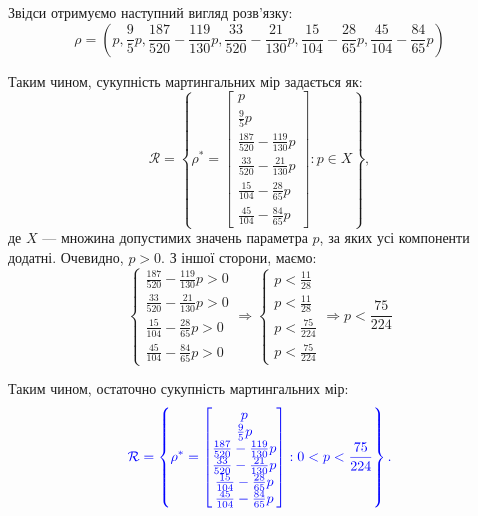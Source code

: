 \documentclass{test_template}
\begin{document}
Звідси отримуємо наступний вигляд розв'язку:
\begin{equation*}
    \rho = \left( p, \frac{9}{5}p, \frac{187}{520}-\frac{119}{130}p, \frac{33}{520} - \frac{21}{130}p, \frac{15}{104}-\frac{28}{65}p, \frac{45}{104}-\frac{84}{65}p\right)
\end{equation*}

Таким чином, сукупність мартингальних мір задається як:
\begin{equation*}
    \mathcal{R} = \left\{ \rho^{*}=\begin{bmatrix}
        p \\ 
        \frac{9}{5}p \\ 
        \frac{187}{520}-\frac{119}{130}p \\ 
        \frac{33}{520} - \frac{21}{130}p \\ 
        \frac{15}{104}-\frac{28}{65}p \\ 
        \frac{45}{104}-\frac{84}{65}p
    \end{bmatrix}: p \in X \right\},
\end{equation*}
де $X$ --- множина допустимих значень параметра $p$, за яких усі компоненти
додатні. Очевидно, $p>0$. З іншої сторони, маємо:
\begin{equation*}
    \begin{cases}
        \frac{187}{520}-\frac{119}{130}p > 0 \\
        \frac{33}{520} - \frac{21}{130}p > 0 \\
        \frac{15}{104}-\frac{28}{65}p > 0 \\
        \frac{45}{104}-\frac{84}{65}p > 0
    \end{cases} \Rightarrow \begin{cases}
        p < \frac{11}{28} \\
        p < \frac{11}{28} \\
        p < \frac{75}{224} \\
        p < \frac{75}{224}
    \end{cases} \Rightarrow p < \frac{75}{224}
\end{equation*}

Таким чином, остаточно сукупність мартингальних мір:
\begin{equation*}
    \textcolor{blue}{\mathcal{R} = \left\{ \rho^{*}=\begin{bmatrix}
        p \\ 
        \frac{9}{5}p \\ 
        \frac{187}{520}-\frac{119}{130}p \\ 
        \frac{33}{520} - \frac{21}{130}p \\ 
        \frac{15}{104}-\frac{28}{65}p \\ 
        \frac{45}{104}-\frac{84}{65}p
    \end{bmatrix}: 0 < p < \frac{75}{224} \right\}.}
\end{equation*}
\end{document}
